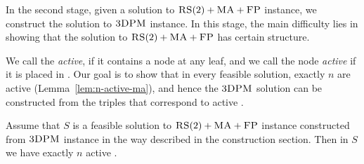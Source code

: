 In the second stage, given a solution to $\textsc{RS}(2)+\textsc{MA}+\textsc{FP}$ instance, we construct the solution to $\textsc{3DPM}$ instance.
In this stage, the main difficulty lies in showing that the solution to $\textsc{RS}(2)+\textsc{MA}+\textsc{FP}$ has certain structure.

We call the {\TripleGadget} \textit{active}, if it contains a node at any leaf, and we call the node \textit{active} if it is placed in {\TripleGadget}.
Our goal is to show that in every feasible solution, exactly $n$ \TripleGadgets{} are active (Lemma~\ref{lem:n-active-ma}), and hence the $\textsc{3DPM}$ solution can be constructed from the triples that correspond to active \TripleGadgets{}.

\begin{lemma}
  Assume that $S$ is a feasible solution to $\textsc{RS}(2)+\textsc{MA}+\textsc{FP}$ instance constructed from $\textsc{3DPM}$ instance in the way described in the construction section.
  Then in $S$ we have exactly $n$ active \TripleGadgets{}.
  \label{lem:n-active-ma}
\end{lemma}

